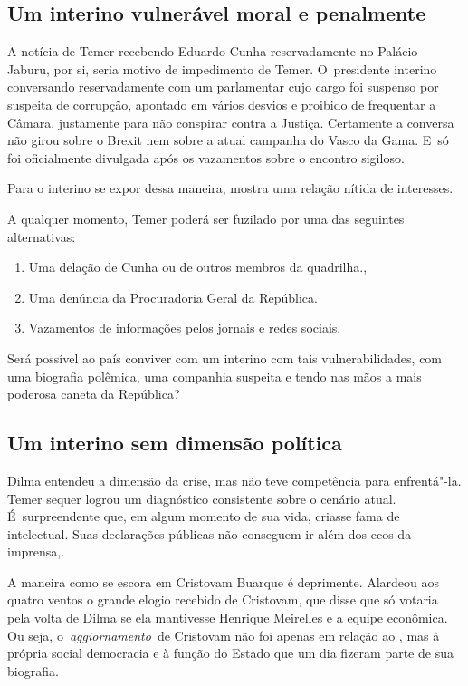 \subsection{Um interino vulnerável moral e penalmente}

A notícia de Temer recebendo Eduardo Cunha reservadamente no Palácio
Jaburu, por si, seria motivo de impedimento de Temer. O~presidente
interino conversando reservadamente com um parlamentar cujo cargo foi
suspenso por suspeita de corrupção, apontado em vários desvios e
proibido de frequentar a Câmara, justamente para não conspirar contra a
Justiça. Certamente a conversa não girou sobre o Brexit nem sobre a
atual campanha do Vasco da Gama. E~só foi oficialmente divulgada após os
vazamentos sobre o encontro sigiloso.

Para o interino se expor dessa maneira, mostra uma relação nítida de
interesses.

A qualquer momento, Temer poderá ser fuzilado por uma das seguintes
alternativas:

\begin{enumerate}
\itemsep1pt\parskip0pt
\item
  Uma delação de Cunha ou de outros membros da quadrilha.,
\item
  Uma denúncia da Procuradoria Geral da República.
\item
  Vazamentos de informações pelos jornais e redes sociais.
\end{enumerate}

Será possível ao país conviver com um interino com tais
vulnerabilidades, com uma biografia polêmica, uma companhia suspeita e
tendo nas mãos a mais poderosa caneta da República?

\subsection{Um interino sem dimensão política}

Dilma entendeu a dimensão da crise, mas não teve competência para
enfrentá"-la. Temer sequer logrou um diagnóstico consistente sobre o
cenário atual. É~surpreendente que, em algum momento de sua vida,
criasse fama de intelectual. Suas declarações públicas não conseguem ir
além dos ecos da imprensa,.

A maneira como se escora em Cristovam Buarque é deprimente. Alardeou aos
quatro ventos o grande elogio recebido de Cristovam, que disse que só
votaria pela volta de Dilma se ela mantivesse Henrique Meirelles e a
equipe econômica. Ou seja, o~\emph{aggiornamento}~de Cristovam não foi
apenas em relação ao , mas à própria social democracia e à função do
Estado que um dia fizeram parte de sua biografia.

